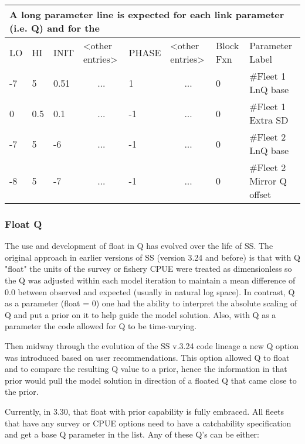 \begin{longtable}{p{1cm} p{1cm} p{1cm}  p{1.5cm}  p{1.5cm}  p{1.5cm} p{1.75cm}  p{4cm} }
	\multicolumn{8}{l}{A long parameter line is expected for each link parameter (i.e. Q) and for the}\\
	\hline
	LO \Tstrut & HI & INIT & <other entries> &  PHASE & <other entries> & Block Fxn & Parameter Label\Bstrut\\
	\hline
	\endfirsthead
	
	\hline
	\endfoot
	\endlastfoot
	
	-7 & 5   & 0.51 & \multicolumn{1}{c}{...} & 1  & \multicolumn{1}{c}{...} & 0  & \#Fleet 1 LnQ base\Tstrut\\
	0  & 0.5 & 0.1  & \multicolumn{1}{c}{...} & -1 & \multicolumn{1}{c}{...} & 0  & \#Fleet 1 Extra SD\Tstrut\\
	-7 & 5   & -6   & \multicolumn{1}{c}{...} & -1 & \multicolumn{1}{c}{...} & 0  & \#Fleet 2 LnQ base\Bstrut\\
	-8 & 5   & -7   & \multicolumn{1}{c}{...} & -1 & \multicolumn{1}{c}{...} & 0  & \#Fleet 2 Mirror Q  offset\Bstrut\\
	\hline
\end{longtable}

\hypertarget{FloatQ}{}
\subsubsection{Float Q}
The use and development of float in Q has evolved over the life of SS. The original approach in earlier versions of SS (version 3.24 and before) is that with Q "float" the units of the survey or fishery CPUE were treated as dimensionless so the Q was adjusted within each model iteration to maintain a mean difference of 0.0 between observed and expected (usually in natural log space).  In contrast, Q as a parameter (float = 0) one had the ability to interpret the absolute scaling of Q and put a prior on it to help guide the model solution.  Also, with Q as a parameter the code allowed for Q to be time-varying.

Then midway through the evolution of the SS v.3.24 code lineage a new Q option was introduced based on user recommendations. This option allowed Q to float and to compare the resulting Q value to a prior, hence the information in that prior would pull the model solution in direction of a floated Q that came close to the prior.

Currently, in 3.30, that float with prior capability is fully embraced.  All fleets that have any survey or CPUE options need to have a catchability specification and get a base Q parameter in the list.  Any of these Q's can be either:

